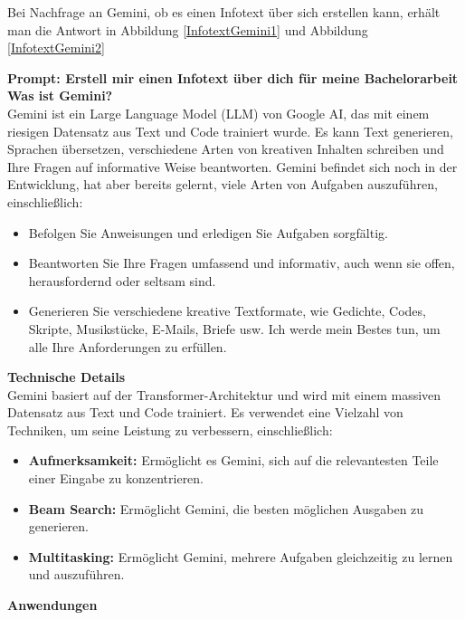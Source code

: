 Bei Nachfrage an Gemini, ob es einen Infotext über sich erstellen kann, erhält man die Antwort in Abbildung \ref{InfotextGemini1} und Abbildung \ref{InfotextGemini2}

\begin{prompt}
    \begin{tcolorbox}[colback=gray!20, colframe=gray!20, boxrule=0pt, sharp corners] 
    \textbf{Prompt: Erstell mir einen Infotext über dich für meine Bachelorarbeit}\\ 
        \textbf{Was ist Gemini?}\\
        Gemini ist ein Large Language Model (LLM) von Google AI, das mit einem riesigen Datensatz aus Text und Code 
        trainiert wurde. Es kann Text generieren, Sprachen übersetzen, verschiedene Arten von kreativen Inhalten schreiben 
        und Ihre Fragen auf informative Weise beantworten. Gemini befindet sich noch in der Entwicklung, hat aber bereits gelernt,
        viele Arten von Aufgaben auszuführen, einschließlich:
        \begin{itemize}
            \item Befolgen Sie Anweisungen und erledigen Sie Aufgaben sorgfältig.
            \item Beantworten Sie Ihre Fragen umfassend und informativ, auch wenn sie offen, herausfordernd oder seltsam sind.
            \item Generieren Sie verschiedene kreative Textformate, wie Gedichte, Codes, Skripte, Musikstücke, E-Mails, Briefe usw. 
                  Ich werde mein Bestes tun, um alle Ihre Anforderungen zu erfüllen.
        \end{itemize}
        \textbf{Technische Details}\\
        Gemini basiert auf der Transformer-Architektur und wird mit einem massiven Datensatz aus Text und Code trainiert. 
        Es verwendet eine Vielzahl von Techniken, um seine Leistung zu verbessern, einschließlich:
        \begin{itemize}
            \item \textbf{Aufmerksamkeit:} Ermöglicht es Gemini, sich auf die relevantesten Teile einer Eingabe zu konzentrieren.
            \item \textbf{Beam Search:} Ermöglicht Gemini, die besten möglichen Ausgaben zu generieren.
            \item \textbf{Multitasking:} Ermöglicht Gemini, mehrere Aufgaben gleichzeitig zu lernen und auszuführen.
        \end{itemize}
        \textbf{Anwendungen}\\

\end{tcolorbox}
\end{prompt}
